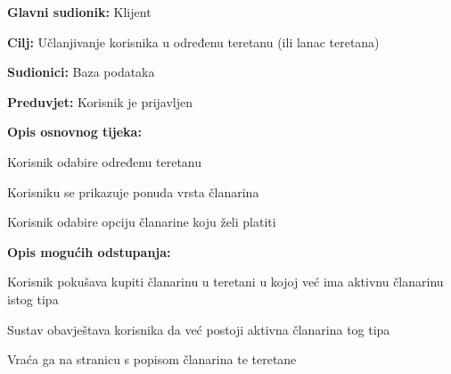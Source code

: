					\noindent {}
					\begin{packed_item}
	
						\item \textbf{Glavni sudionik: }Klijent
						\item  \textbf{Cilj:} Učlanjivanje korisnika u određenu teretanu (ili lanac teretana)
						\item  \textbf{Sudionici:} Baza podataka
						\item  \textbf{Preduvjet:} Korisnik je prijavljen
						\item  \textbf{Opis osnovnog tijeka:}
						
						\item[] \begin{packed_enum}
	
							\item Korisnik odabire određenu teretanu
							\item Korisniku se prikazuje ponuda vrsta članarina
							\item Korisnik odabire opciju članarine koju želi platiti
						\end{packed_enum}
					
						\item  \textbf{Opis mogućih odstupanja:}
						
						\item[] \begin{packed_item}
	
						\item[-]
						Korisnik pokušava kupiti članarinu u teretani u kojoj već ima aktivnu članarinu istog tipa
							\item[] \begin{packed_enum}
								
								\item Sustav obavještava korisnika da već postoji aktivna članarina tog tipa
								\item Vraća ga na stranicu s popisom članarina te teretane
							\end{packed_enum}
						\end{packed_item}
					\end{packed_item}
				
